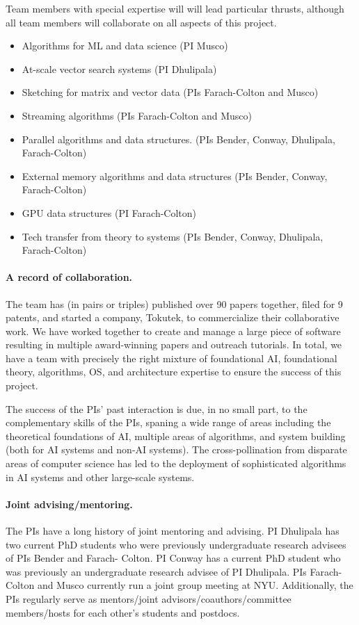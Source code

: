 Team members with special expertise will will lead particular thrusts, although all team members will collaborate on all aspects of this project.
\begin{itemize}
\item Algorithms for ML and data science (PI Musco)
\item At-scale vector search systems (PI Dhulipala)
\item Sketching for matrix and vector data (PIs Farach-Colton and Musco)
\item Streaming algorithms (PIs Farach-Colton and Musco)
\item Parallel algorithms and data structures. (PIs Bender, Conway, Dhulipala, Farach-Colton)
\item External memory algorithms and data structures (PIs Bender, Conway, Farach-Colton)
\item GPU data structures (PI Farach-Colton)
\item Tech transfer from theory to systems (PIs Bender, Conway, Dhulipala, Farach-Colton)
\end{itemize}

\paragraph{A record of collaboration.} The team has (in pairs or triples) published over 90 papers together, filed for
9 patents, and started a company, Tokutek, to commercialize their collaborative work. We have worked
together to create and manage a large piece of software resulting in multiple award-winning papers and
outreach tutorials. In total, we have a team with precisely the right mixture of foundational AI, foundational
theory, algorithms, OS, and architecture expertise to ensure the success of this project.

The success of the PIs’ past interaction is due, in no small part, to the complementary skills of the PIs,
spaning a wide range of areas including the theoretical foundations of AI, multiple areas of algorithms, and
system building (both for AI systems and non-AI systems). The cross-pollination from disparate areas of
computer science has led to the deployment of sophisticated algorithms in AI systems and other large-scale
systems.

\paragraph{Joint advising/mentoring.} The PIs have a long history of joint mentoring and advising. PI Dhulipala has
two current PhD students who were previously undergraduate research advisees of PIs Bender and Farach-
Colton. PI Conway has a current PhD student who was previously an undergraduate research advisee of PI
Dhulipala. PIs Farach-Colton and Musco currently run a joint group meeting at NYU. Additionally, the PIs
regularly serve as mentors/joint advisors/coauthors/committee members/hosts for each other’s students and
postdocs.


